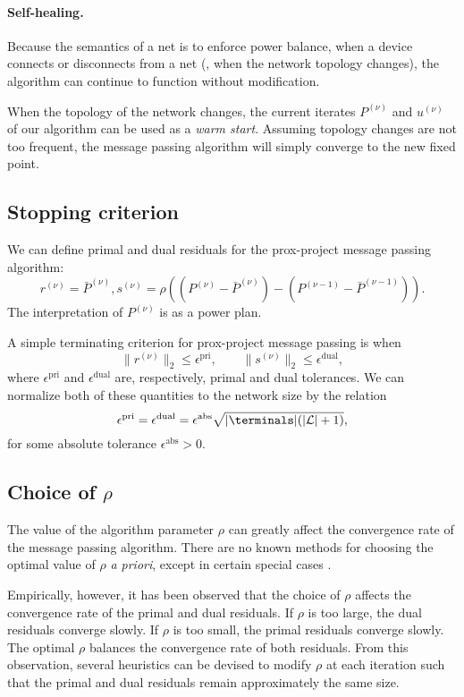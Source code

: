 \paragraph{Self-healing.} Because the semantics of a net is to enforce
power balance, when a device connects or disconnects from a net (\ie,
when the network topology changes), the algorithm can continue to
function without modification.

When the topology of the network changes, the current iterates $P^{(\nu)}$ and
$u^{(\nu)}$ of our algorithm can be used as a \emph{warm start}. Assuming
topology changes are not too frequent, the message passing algorithm
will simply converge to the new fixed point.

\subsection{Stopping criterion}We can define primal and dual residuals for the
prox-project message passing algorithm:
\[
r^{(\nu)} = \bar P^{(\nu)},
s^{(\nu)} = \rho\left((P^{(\nu)} - \bar P^{(\nu)}) - (P^{(\nu-1)} - \bar P^{(\nu-1)})\right).
\]
The
interpretation of $P^{(\nu)}$ is as a power plan.

A simple terminating criterion for prox-project message passing is when
\[
\| r^{(\nu)} \|_2 \leq \epsilon^\mathrm{pri}, \qquad \|s^{(\nu)}\|_2 \leq \epsilon^\mathrm{dual},
\]
where $\epsilon^\mathrm{pri}$ and $\epsilon^\mathrm{dual}$ are,
respectively, primal and dual tolerances. We can normalize both of these
quantities to the network size by the relation
\[
\epsilon^\mathrm{pri} = \epsilon^\mathrm{dual} = \epsilon^\mathrm{abs} \sqrt{|\terminals|(|\mathcal{L}|+1)},
\]
for some absolute tolerance $\epsilon^\mathrm{abs} > 0$.

\subsection{Choice of $\rho$}
The value of the algorithm parameter $\rho$ can greatly affect the
convergence rate of the message passing algorithm. There are no known
methods for choosing the optimal value of $\rho$ \emph{a priori}, except
in certain special cases \cite{GT:12}.

Empirically, however, it has been observed that the choice of $\rho$
affects the convergence rate of the primal and dual residuals. If $\rho$
is too large, the dual residuals converge slowly. If $\rho$ is too
small, the primal residuals converge slowly. The optimal $\rho$ balances
the convergence rate of both residuals. From this observation, several
heuristics can be devised to modify $\rho$ at each iteration such that
the primal and dual residuals remain approximately the same size.

